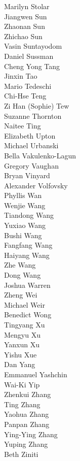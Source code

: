 Marilyn Stolar\\
Jiangwen Sun\\
Zhaonan Sun\\
Zhichao Sun\\
Vasin  Suntayodom\\
Daniel Sussman\\
Cheng Yong Tang\\
Jinxin Tao\\
Mario  Tedeschi\\
Chi-Hse Teng\\
Zi Han (Sophie) Tew\\
Suzanne Thornton\\
Naitee Ting\\
Elizabeth Upton\\
Michael Urbanski\\
Bella Vakulenko-Lagun\\
Gregory Vaughan\\
Bryan Vinyard\\
Alexander Volfovsky\\
Phyllis Wan\\
Wenjie Wang\\
Tiandong Wang\\
Yuxiao Wang\\
Bushi Wang\\
Fangfang Wang\\
Haiyang Wang\\
Zhe Wang\\
Dong Wang\\
Joshua Warren\\
Zheng Wei\\
Michael Weir\\
Benedict Wong\\
Tingyang Xu\\
Mengyu Xu\\
Yanxun Xu\\
Yishu Xue\\
Dan Yang\\
Emmanuel Yashchin\\
Wai-Ki Yip\\
Zhenkui Zhang\\
Ting Zhang\\
Yaohua  Zhang\\
Panpan Zhang\\
Ying-Ying Zhang\\
Yuping Zhang\\
Beth Ziniti\\
